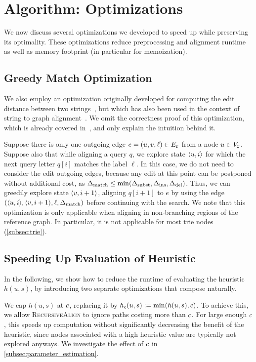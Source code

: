 \section{\astarix Algorithm: Optimizations} \label{sec:optimizations}
We now discuss several optimizations we developed to speed up \astarix while
preserving its optimality. These optimizations reduce preprocessing and
alignment runtime as well as memory footprint (in particular for memoization).



\subsection{Greedy Match Optimization} \label{subsec:greedy}
We also employ an optimization originally developed for computing the edit
distance between two strings~\cite{sellers_algorithm_1974,allison_lazy_1992}, but
which has also been used in the context of string to graph
alignment~\cite{dox2018efficient}. We omit the correctness proof of this
optimization, which is already covered
in~\cite{sellers_algorithm_1974}, and only explain the intuition behind it.

Suppose there is only one outgoing edge $e = (u, v, \ell) \in E_\texttt{r}$ from a node
$u \in V_\texttt{r}$. Suppose also that while aligning a query $q$, we explore state
$\langle u, i \rangle$ for which the next query letter $q[i]$ matches the label $\ell$. In
this case, we do not need to consider the edit outgoing edges, because
any edit at this point can be postponed without additional cost, as $\Delta_\text{match}
\leq \min(\Delta_\text{subst}, \Delta_\text{ins}, \Delta_\text{del})$. Thus, we can greedily explore state
$\langle v, i+1 \rangle$, aligning $q[i+1]$ to $e$ by using the edge $(\langle u, i \rangle,
\langle v, i+1 \rangle, \ell, \Delta_\text{match})$ before continuing with the \A search.
We note that this optimization is only applicable when aligning in non-branching
regions of the reference graph. In particular, it is not applicable for most
trie nodes (\cref{subsec:trie}).

\subsection{Speeding Up Evaluation of Heuristic} \label{subsec:speedup-heuristic}
In the following, we show how to reduce the runtime of evaluating the heuristic
$h(u,s)$, by introducing two separate optimizations that compose naturally.

 We cap $h(u,s)$ at $c$, replacing it by
$h_{c}(u,s):=\min(h(u,s),c)$. To achieve this, we allow
\textsc{RecursiveAlign} to ignore paths costing more than $c$.
%
For large enough $c$, this speeds up computation without significantly
decreasing the benefit of the heuristic, since nodes associated with a high
heuristic value are typically not explored anyways. We investigate the effect of
$c$ in \cref{subsec:parameter_estimation}.

